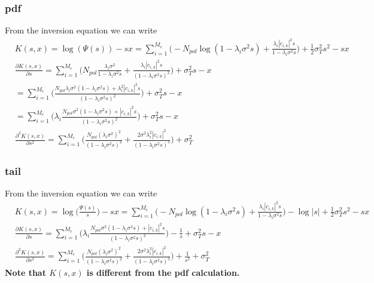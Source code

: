 \documentclass[a4paper]{article}
\begin{document}
\subsubsection{pdf}
From the inversion equation we can write
\begin{align} \label{mgf-pdf-derivatives}
& K(s,x) = \log (\Psi(s)) - sx = \sum_{i = 1}^{M_e}\bigg( -N_{pol}\log(1-\lambda_i\sigma^2s) + \frac{\lambda_i|c_{i,k}|^2s}{1-\lambda_i\sigma^2s}\bigg) +\frac{1}{2}\sigma_T^2s^2 - sx  \\ \nonumber
&\frac{\partial K(s,x)}{\partial s} = \sum_{i = 1}^{M_e}\bigg( N_{pol}\frac{\lambda_i\sigma^2}{1-\lambda_i\sigma^2s} + \frac{\lambda_i|c_{i,k}|^2s}{(1-\lambda_i\sigma^2s)^2}\bigg) + \sigma_T^2s - x \\ \nonumber
& = \sum_{i = 1}^{M_e}\bigg( \frac{N_{pol}\lambda_i\sigma^2(1-\lambda_i\sigma^2s) + \lambda_i^2|c_{i,k}|^2s}{(1-\lambda_i\sigma^2s)^2}\bigg) + \sigma_T^2s - x \\
& = \sum_{i = 1}^{M_e}\bigg( \lambda_i\frac{N_{pol}\sigma^2(1-\lambda_i\sigma^2s) +|c_{i,k}|^2s}{(1-\lambda_i\sigma^2s)^2}\bigg) + \sigma_T^2s - x \\
&\frac{\partial^2 K(s,x)}{\partial s^2} = \sum_{i = 1}^{M_e}\bigg( \frac{N_{pol}(\lambda_i\sigma^2)^2}{(1-\lambda_i\sigma^2s)^2} + \frac{2\sigma^2\lambda_i^2|c_{i,k}|^2}{(1-\lambda_i\sigma^2s)^3}\bigg) + \sigma_T^2
\end{align}

\subsubsection{tail}
From the inversion equation we can write 
\begin{align}
& K(s,x) = \log \Big(\frac{\Psi(s)}{s}\Big) - sx =  \sum_{i = 1}^{M_e}\bigg( -N_{pol}\log(1-\lambda_i\sigma^2s) + \frac{\lambda_i|c_{i,k}|^2s}{1-\lambda_i\sigma^2s}\bigg) -\log |s| +\frac{1}{2}\sigma_T^2s^2 - sx  \\
&\frac{\partial K(s,x)}{\partial s} = \sum_{i = 1}^{M_e}\bigg( \lambda_i\frac{N_{pol}\sigma^2(1-\lambda_i\sigma^2s) +|c_{i,k}|^2s}{(1-\lambda_i\sigma^2s)^2}\bigg) - \frac{1}{s} + \sigma_T^2s - x \\
&\frac{\partial^2 K(s,x)}{\partial s^2} = \sum_{i = 1}^{M_e}\bigg( \frac{N_{pol}(\lambda_i\sigma^2)^2}{(1-\lambda_i\sigma^2s)^2} + \frac{2\sigma^2\lambda_i^2|c_{i,k}|^2}{(1-\lambda_i\sigma^2s)^3}\bigg) + \frac{1}{s^2} + \sigma_T^2
\end{align}
\textbf{Note that $K(s, x)$ is different from the pdf calculation.}
\end{document}
